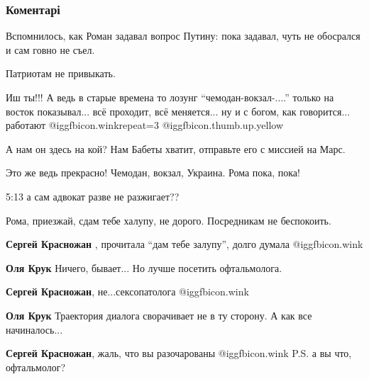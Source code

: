  
 
 
 
 
\subsubsection{Коментарі}
\label{sec:10_12_2021.fb.sharij_anatolij.1.ne_hochu_pokidat_mordor.cmt}

\begin{itemize} %
Вспомнилось, как Роман задавал вопрос Путину: пока задавал, чуть не обосрался и сам говно не съел.

Патриотам не привыкать.


Иш ты!!! А ведь в старые времена то лозунг \enquote{чемодан-вокзал-....} только на
восток показывал... всё проходит, всё меняется... ну и с богом, как
говорится... работают @igg{fbicon.wink}{repeat=3}  @igg{fbicon.thumb.up.yellow} 


А нам он здесь на кой? Нам Бабеты хватит, отправьте его с миссией на Марс.

Это же ведь прекрасно! Чемодан, вокзал, Украина. Рома пока, пока!

5:13 а сам адвокат разве не разжигает??

Рома, приезжай, сдам тебе халупу, не дорого. Посредникам не беспокоить.

\begin{itemize} %
\textbf{Сергей Красножан} , прочитала \enquote{дам тебе залупу}, долго думала  @igg{fbicon.wink} 

\textbf{Оля Крук} Ничего, бывает... Но лучше посетить офтальмолога.

\textbf{Сергей Красножан}, не...сексопатолога  @igg{fbicon.wink} 

\textbf{Оля Крук} Траектория диалога сворачивает не в ту сторону. А как все начиналось...

\textbf{Сергей Красножан}, жаль, что вы разочарованы  @igg{fbicon.wink} 
P.S. а вы что, офтальмолог?
\end{itemize} %


\end{itemize}

